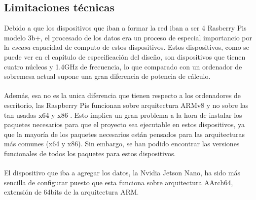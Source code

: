 \subsection{Limitaciones técnicas}
Debido a que los dispositivos que iban a formar la red iban a ser 4 Rasberry Pis modelo 3b+, el procesado de los datos era un proceso de especial importancio por la \textit{escasa} capacidad de computo de estos dispositivos. Estos dispositivos, como se puede ver en el capítulo de especificación del diseño, son dispositivos que tienen cuatro núcleos y 1.4GHz de frecuencia, lo que comparado con un ordenador de sobremesa actual supone una gran diferencia de potencia de cálculo.
\\ \\
Además, esa no es la unica diferencia que tienen respecto a los ordenadores de escritorio, las Raspberry Pis funcionan sobre arquitectura ARMv8 y no sobre las tan usadas x64 y x86 . Esto implica un gran problema a la hora de instalar los paquetes necesarios para que el proyecto sea ejecutable en estos dispositivos, ya que la mayoría de los paquetes necesarios están pensados para las arquitecturas más comunes (x64 y x86). Sin embargo, se han podido encontrar las versiones funcionales de todos los paquetes para estos dispositivos.
\\ \\
El dispositivo que iba a agregar los datos, la Nvidia Jetson Nano, ha sido más sencilla de configurar puesto que esta funciona sobre arquitectura AArch64, extensión de 64bits de la arquitectura ARM.
